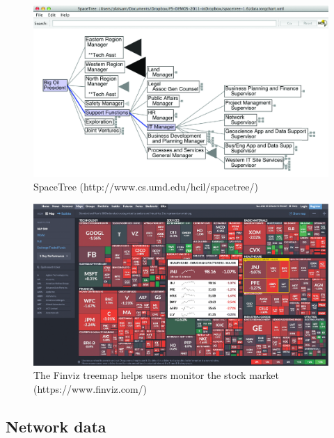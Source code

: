 \documentclass[]{krantz}
\begin{document}
\begin{figure}

{\centering \includegraphics[width=0.9\linewidth]{ChapterViz/figures/fig9-8} 

}

\caption{SpaceTree (http://www.cs.umd.edu/hcil/spacetree/)}\label{fig:fig9-8}
\end{figure}

\begin{figure}

{\centering \includegraphics[width=0.9\linewidth]{ChapterViz/figures/fig9-9} 

}

\caption{The Finviz treemap helps users monitor the stock market (https://www.finviz.com/)}\label{fig:fig9-9}
\end{figure}

\subsection{Network data}\label{sec:viz-2.6}
\end{document}
